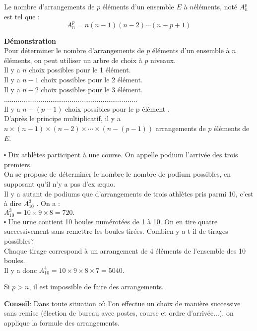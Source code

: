 \begin{theorem}
Le nombre d'arrangements de $ p $ éléments  d'un ensemble $ E $ à $ n $éléments,  noté  $ A_{n}^{p} $  est tel que :
\[  A_{n}^{p}= n(n-1)(n-2)\cdots (n-p+1)\]
\end{theorem}
\textbf{Démonstration}\\
Pour déterminer le nombre d'arrangements de $ p $ éléments d'un ensemble à $ n $ éléments, on peut utiliser un arbre de choix  à $ p $ niveaux.\\
Il y a $ n $ choix possibles pour  le 1 élément.\\
Il y a $ n-1 $ choix possibles  pour le 2 élément.\\
Il y a $ n-2 $ choix possibles pour le 3 élément.\\
.....................................................................\\
Il y a $ n-(p-1) $ choix possibles pour  le p élément .\\
D'après le principe multiplicatif, il y a $ n \times ( n-1) \times (n-2) \times \cdots \times (n-(p-1)) $  arrangements de $ p $  éléments de $ E $.
\begin{example}
$ \centerdot  $  Dix athlètes participent à une course. On appelle podium l'arrivée des trois premiers.\\
On se propose de déterminer le nombre le nombre de podium possibles, en supposant qu'il n'y a pas d'ex æquo.\\
Il y a autant de podiums  que d'arrangements de trois athlètes pris parmi 10, c'est à dire $ A_{10}^{3} $ . On a : \\
$A_{10}^{3} =10\times 9\times 8=720.  $\\
$ \centerdot $ Une urne contient 10 boules numérotées de 1 à 10. On en tire quatre successivement sans  remettre  les boules tirées.  Combien y a t-il de tirages  possibles? \\
Chaque tirage correspond à un arrangement de 4 éléments de l'ensemble des 10 boules.\\
Il y a donc $A_{10}^{4} =10\times 9\times 8 \times 7 =5040.  $
\end{example}
\begin{remark}
Si $  p > n $, il est impossible de faire des arrangements.
\end{remark}
\textbf{Conseil}: Dans toute situation  où l'on effectue un choix de manière successive sans remise (élection de bureau avec postes, course et ordre d'arrivée...), on applique la formule des arrangements.
